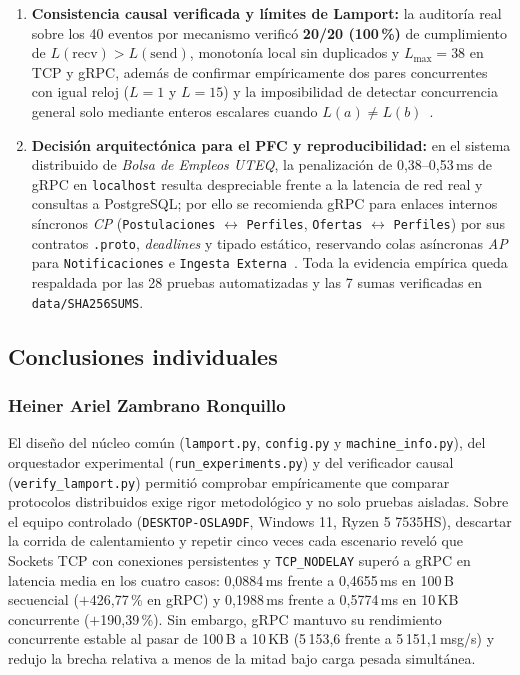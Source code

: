 \documentclass[12pt,a4paper]{article}
\begin{document}
\begin{enumerate}
  \item \textbf{Consistencia causal verificada y límites de Lamport:} la auditoría real sobre los 40 eventos por mecanismo verificó \textbf{20/20 (100\,\%)} de cumplimiento de $L(\mathrm{recv}) > L(\mathrm{send})$, monotonía local sin duplicados y $L_{\max} = 38$ en TCP y gRPC, además de confirmar empíricamente dos pares concurrentes con igual reloj ($L = 1$ y $L = 15$) y la imposibilidad de detectar concurrencia general solo mediante enteros escalares cuando $L(a) \neq L(b)$~\cite{castello2024inductive,mathur2022treeclock}.
  \item \textbf{Decisión arquitectónica para el PFC y reproducibilidad:} en el sistema distribuido de \emph{Bolsa de Empleos UTEQ}, la penalización de 0,38--0,53\,ms de gRPC en \texttt{localhost} resulta despreciable frente a la latencia de red real y consultas a PostgreSQL; por ello se recomienda gRPC para enlaces internos síncronos \emph{CP} (\texttt{Postulaciones} $\leftrightarrow$ \texttt{Perfiles}, \texttt{Ofertas} $\leftrightarrow$ \texttt{Perfiles}) por sus contratos \texttt{.proto}, \emph{deadlines} y tipado estático, reservando colas asíncronas \emph{AP} para \texttt{Notificaciones} e \texttt{Ingesta Externa}~\cite{khoshaba2023cap,mohammad2025resilient,zhu2025rethinking}. Toda la evidencia empírica queda respaldada por las 28 pruebas automatizadas y las 7 sumas verificadas en \texttt{data/SHA256SUMS}.
\end{enumerate}

\subsection{Conclusiones individuales}

\subsubsection*{Heiner Ariel Zambrano Ronquillo}

El diseño del núcleo común (\texttt{lamport.py}, \texttt{config.py} y \texttt{machine\_info.py}), del orquestador experimental (\texttt{run\_experiments.py}) y del verificador causal (\texttt{verify\_lamport.py}) permitió comprobar empíricamente que comparar protocolos distribuidos exige rigor metodológico y no solo pruebas aisladas. Sobre el equipo controlado (\texttt{DESKTOP-OSLA9DF}, Windows 11, Ryzen 5 7535HS), descartar la corrida de calentamiento y repetir cinco veces cada escenario reveló que Sockets TCP con conexiones persistentes y \texttt{TCP\_NODELAY} superó a gRPC en latencia media en los cuatro casos: 0,0884\,ms frente a 0,4655\,ms en 100\,B secuencial ($+$426,77\,\% en gRPC) y 0,1988\,ms frente a 0,5774\,ms en 10\,KB concurrente ($+$190,39\,\%). Sin embargo, gRPC mantuvo su rendimiento concurrente estable al pasar de 100\,B a 10\,KB (5\,153,6 frente a 5\,151,1\,msg/s) y redujo la brecha relativa a menos de la mitad bajo carga pesada simultánea.
\end{document}
